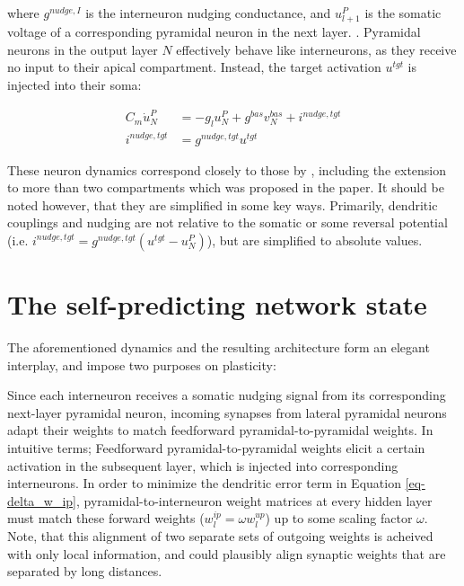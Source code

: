 where $ g^{nudge, I}$ is the interneuron nudging conductance, and $u_{l+1}^P$ is the somatic voltage of a corresponding
pyramidal neuron in the next layer. . Pyramidal neurons
in the output layer $N$ effectively behave like interneurons, as they receive no input to their apical compartment. Instead,
the target  activation $u^{tgt}$ is injected into their soma:

\begin{align}
  C_m \dot{u}_N^P & = - g_l u_N^{P} + g^{bas} v_N^{bas} + i^{nudge, tgt} \\
  i^{nudge, tgt}  & = g^{nudge, tgt} u^{tgt}
\end{align}


These neuron dynamics correspond closely to those by \cite{urbanczik2014learning}, including
the extension to more than two compartments which was proposed in the paper. It should be noted however, that they are
simplified in some key ways. Primarily, dendritic couplings and nudging are not relative to the somatic or some reversal potential
(i.e. $i^{nudge, tgt}= g^{nudge, tgt} (u^{tgt} - u_N^P )$),
but are simplified to absolute values. 


\section{The self-predicting network state}

The aforementioned dynamics and the resulting architecture form an elegant interplay, and impose two
purposes on plasticity:

Since each interneuron receives a somatic nudging signal from its corresponding next-layer pyramidal neuron, incoming
synapses from lateral pyramidal neurons adapt their weights to match feedforward pyramidal-to-pyramidal weights. In
intuitive terms; Feedforward pyramidal-to-pyramidal weights elicit a certain activation in the subsequent layer, which
is injected into corresponding interneurons. In order to minimize the dendritic error term in Equation
\ref{eq-delta_w_ip}, pyramidal-to-interneuron weight matrices at every hidden layer must match these forward weights
($w_l^{ip} = \omega w_l^{up}$) up to some scaling factor $\omega$.
Note, that this alignment of two separate sets of outgoing weights is acheived with only local information, and could
plausibly align synaptic weights that are separated by long distances. \newline

